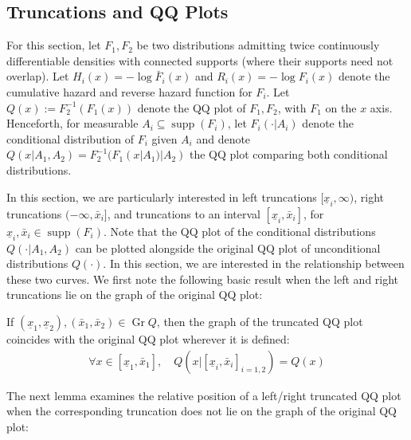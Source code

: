 \subsection{Truncations and QQ Plots}\label{section:truncations}

\noindent For this section, let $F_1,F_2$ be two distributions admitting twice continuously differentiable densities with connected supports (where their supports need not overlap). Let $H_i(x) = -\log \bar{F}_i(x)$ and $R_i(x) = -\log F_i(x)$ denote the cumulative hazard and reverse hazard function for $F_i$. Let $Q(x):=F_2^{-1}(F_1(x))$ denote the QQ plot of $F_1,F_2$, with $F_1$ on the $x$ axis. Henceforth, for measurable $A_i\subseteq \operatorname{supp}(F_i)$, let $F_i(\cdot|A_i)$ denote the conditional distribution of $F_i$ given $A_i$ and denote $Q(x|A_1,A_2) = F_2^{-1}(F_1(x|A_1)|A_2)$ the QQ plot comparing both conditional distributions. 

\noindent In this section, we are particularly interested in left truncations $[\underline{x}_i,\infty)$, right truncations $(-\infty,\bar{x}_i]$, and truncations to an interval $[\underline{x}_i,\bar{x}_i]$, for $\underline{x}_i,\bar{x}_i\in \operatorname{supp}(F_i)$. Note that the QQ plot of the conditional distributions $Q(\cdot|A_1,A_2)$ can be plotted alongside the original QQ plot of unconditional distributions $Q(\cdot)$. In this section, we are interested in the relationship between these two curves. We first note the following basic result when the left and right truncations lie on the graph of the original QQ plot:

\begin{lemma}\label{lemma:QQ_preservation}
If $(\underline{x}_1,\underline{x}_2),(\bar{x}_1,\bar{x}_2)\in \operatorname{Gr} Q$, then the graph of the truncated QQ plot coincides with the original QQ plot wherever it is defined:
\begin{align*}
    \forall x\in [\underline{x}_1,\bar{x}_1],\quad Q(x|[\underline{x}_i,\bar{x}_i]_{i=1,2}) = Q(x)
\end{align*}
\end{lemma}

\noindent The next lemma examines the relative position of a left/right truncated QQ plot when the corresponding truncation does not lie on the graph of the original QQ plot:

